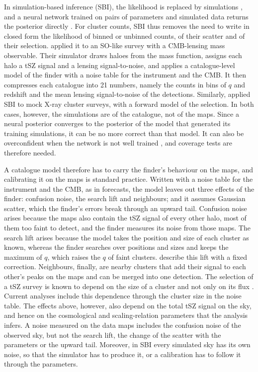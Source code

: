 In simulation-based inference (SBI), the likelihood is replaced by simulations \citep{Cranmer2020}, and a
neural network trained on pairs of parameters and simulated data returns the posterior directly
\citep{Papamakarios2016,Alsing2019}. For cluster counts, SBI thus removes the need to write in closed form
the likelihood of binned or unbinned counts, of their scatter and of their selection. \citet{Zubeldia2025}
applied it to an SO-like survey with a CMB-lensing mass observable. Their simulator draws haloes from the
mass function, assigns each halo a tSZ signal and a lensing signal-to-noise, and applies a catalogue-level
model of the finder with a noise table for the instrument and the CMB. It then compresses each catalogue
into 21 numbers, namely the counts in bins of $q$ and redshift and the mean lensing signal-to-noise of the
detections. Similarly, \citet{Regamey2026} applied SBI to mock X-ray cluster surveys, with a forward model
of the selection. In both cases, however, the simulations are of the catalogue, not of the maps. Since a
neural posterior converges to the posterior of the model that generated its training simulations, it can
be no more correct than that model. It can also be overconfident when the network is not well trained
\citep{Hermans2022}, and coverage tests are therefore needed.

A catalogue model therefore has to carry the finder's behaviour on the maps, and calibrating it on the
maps is standard practice. Written with a noise table for the instrument and the CMB, as in forecasts,
the model leaves out three effects of the finder: confusion noise, the search lift and neighbours; and it
assumes Gaussian scatter, which the finder's errors break through an upward tail. Confusion noise arises
because the maps also contain the tSZ signal of every other halo, most of them too faint to detect, and the
finder measures its noise from those maps. The search lift arises because the model takes the position
and size of each cluster as known, whereas the finder searches over positions and sizes and keeps the
maximum of $q$, which raises the $q$ of faint clusters. \citet{Vanderlinde2010} describe this lift with
a fixed correction. Neighbours, finally, are nearby clusters that add their signal to
each other's peaks on the maps and can be merged into one detection. The selection of a tSZ survey is
known to depend on the size of a cluster and not only on its flux \citep{Melin2005}. Current analyses include this dependence through the cluster size in the noise table. The effects above, however, also
depend on the total tSZ signal on the sky, and hence on the cosmological and scaling-relation parameters
that the analysis infers. A noise measured on the data maps includes the confusion noise of the observed
sky, but not the search lift, the change of the scatter with the parameters or the upward tail. Moreover,
in SBI every simulated sky has its own noise, so that the simulator has to produce it, or a calibration
has to follow it through the parameters.

